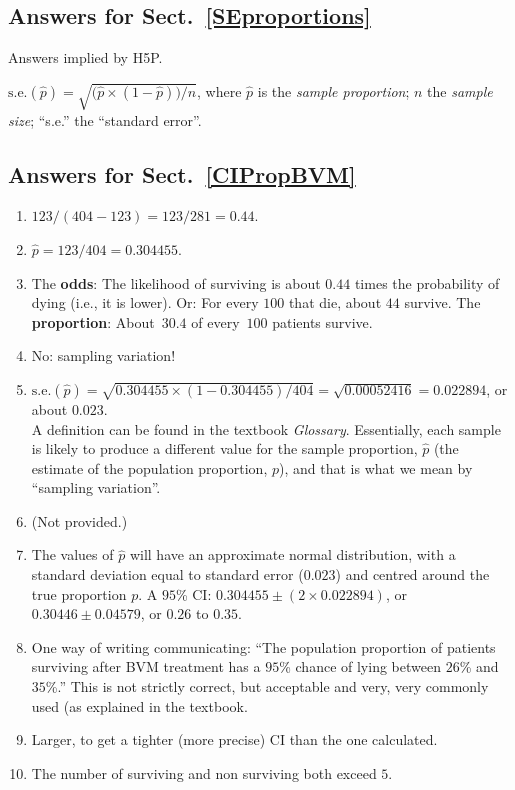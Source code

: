 \documentclass[
  11pt,
  a4paper,
  krantz2]{krantz}
\providecommand{\tightlist}{%
  \setlength{\itemsep}{0pt}\setlength{\parskip}{0pt}}
\begin{document}
\begin{footnotesize}
\subsection*{Answers for Sect.~\ref{SEproportions}}\label{answers-for-sect.-refseproportions}

Answers implied by H5P.

\(\displaystyle \text{s.e.}(\hat{p}) = \sqrt{ \big(\hat{p}\times(1 - \hat{p}) \big)/n}\), where \(\hat{p}\) is the \emph{sample proportion}; \(n\) the \emph{sample size}; ``s.e.'' the ``standard error''.

\subsection*{Answers for Sect.~\ref{CIPropBVM}}\label{answers-for-sect.-refcipropbvm}

\begin{enumerate}
\def\labelenumi{\arabic{enumi}.}
\tightlist
\item
  \(123/(404 - 123) = 123/281 = 0.44\).\tightlist
\item
  \(\hat{p} = 123/404 = 0.304455\).
\item
  The \textbf{odds}: The likelihood of surviving is about \(0.44\) times the probability of dying (i.e., it is lower).
  Or: For every \(100\) that die, about \(44\) survive.
  The \textbf{proportion}: About~\(30.4\) of every~\(100\) patients survive.
\item
  No: sampling variation!
\item
  \(\text{s.e.}(\hat{p}) = \sqrt{0.304455 \times (1 - 0.304455)/404} = \sqrt{0.00052416} = 0.022894\), or about \(0.023\).\\
  A definition can be found in the textbook \emph{Glossary}.
  Essentially, each sample is likely to produce a different value for the sample proportion, \(\hat{p}\) (the estimate of the population proportion, \(p\)), and that is what we mean by ``sampling variation''.
\item
  (Not provided.)
\item
  The values of \(\hat{p}\) will have an approximate normal distribution, with a standard deviation equal to standard error (\(0.023\)) and centred around the true proportion \(p\).
  A \(95\)\% CI: \(0.304455 \pm (2\times0.022894)\), or \(0.30446\pm0.04579\), or \(0.26\) to \(0.35\).
\item
  One way of writing communicating: ``The population proportion of patients surviving after BVM treatment has a \(95\)\% chance of lying between \(26\)\% and \(35\)\%.''
  This is not strictly correct, but acceptable and very, very commonly used (as explained in the textbook.
\item
  Larger, to get a tighter (more precise) CI than the one calculated.
\item
  The number of surviving and non surviving both exceed \(5\).
\end{enumerate}


\end{footnotesize}
\end{document}
